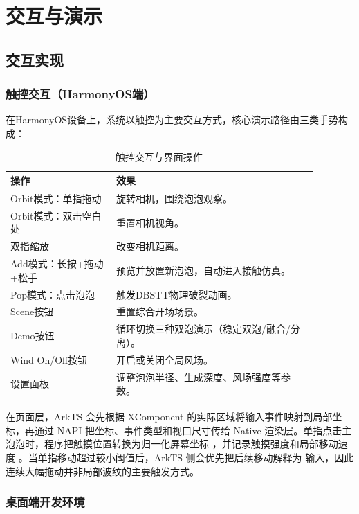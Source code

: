 
\chapter{交互与演示}

\section{交互实现}

\subsection{触控交互（HarmonyOS端）}

在HarmonyOS设备上，系统以触控为主要交互方式，核心演示路径由三类手势构成：

\begin{table}[H]
  \centering
  \caption{触控交互与界面操作}
  \begin{tabular}{p{0.30\linewidth}p{0.58\linewidth}}
    \toprule
    操作 & 效果 \\
    \midrule
    Orbit模式：单指拖动 & 旋转相机，围绕泡泡观察。\\
    Orbit模式：双击空白处 & 重置相机视角。\\
    双指缩放 & 改变相机距离。\\
    Add模式：长按+拖动+松手 & 预览并放置新泡泡，自动进入接触仿真。\\
    Pop模式：点击泡泡 & 触发DBSTT物理破裂动画。\\
    Scene按钮 & 重置综合开场场景。\\
    Demo按钮 & 循环切换三种双泡演示（稳定双泡/融合/分离）。\\
    Wind On/Off按钮 & 开启或关闭全局风场。\\
    设置面板 & 调整泡泡半径、生成深度、风场强度等参数。\\
    \bottomrule
  \end{tabular}
\end{table}

在页面层，ArkTS 会先根据 XComponent 的实际区域将输入事件映射到局部坐标，再通过 NAPI 把坐标、事件类型和视口尺寸传给 Native 渲染层。单指点击主泡泡时，程序把触摸位置转换为归一化屏幕坐标 ，并记录触摸强度和局部移动速度 。当单指移动超过较小阈值后，ArkTS 侧会优先把后续移动解释为  输入，因此连续大幅拖动并非局部波纹的主要触发方式。

\subsection{桌面端开发环境}

